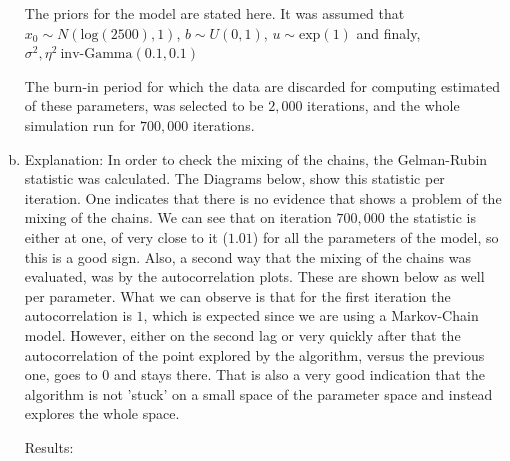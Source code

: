 \documentclass[12pt,a4paper]{article}
\begin{document}
\begin{enumerate}[(a)]
The priors for the model are stated here. It was assumed that $x_0 \sim N(\text{log}(2500),1)$, $b \sim U(0,1)$, $u \sim \text{exp}(1)$ and finaly, $\sigma^2, \eta^2 ~ \text{inv-Gamma}(0.1,0.1)$

The burn-in period for which the data are discarded for computing estimated of these parameters, was selected to be $2,000$ iterations, and the whole simulation run for $700,000$ iterations.

\item
Explanation: In order to check the mixing of the chains, the Gelman-Rubin statistic was calculated. The Diagrams below, show this statistic per iteration. One indicates that there is no evidence that shows a problem of the mixing of the chains. We can see that on iteration $700,000$ the statistic is either at one, of very close to it ($1.01$) for all the parameters of the model, so this is a good sign. Also, a second way that the mixing of the chains was evaluated, was by the autocorrelation plots. These are shown below as well per parameter. What we can observe is that for the first iteration the autocorrelation is $1$, which is expected since we are using a Markov-Chain model. However, either on the second lag or very quickly after that the autocorrelation of the point explored by the algorithm, versus the previous one, goes to $0$ and stays there. That is also a very good indication that the algorithm is not 'stuck' on a small space of the parameter space and instead explores the whole space. 

Results:


\end{enumerate}
\end{document}
